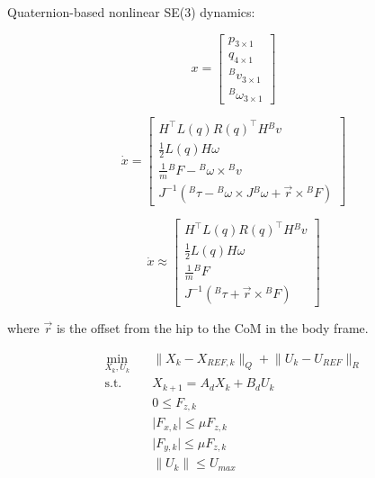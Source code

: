 \documentclass{article}
\begin{document}
Quaternion-based nonlinear SE(3) dynamics:

\begin{equation}
x = 
\begin{bmatrix}
	p_{3 \times 1}\\
	q_{4 \times 1}\\
	{}^Bv_{3 \times 1}\\
	{}^B\omega_{3 \times 1}
\end{bmatrix}
\end{equation}

\begin{equation}
\dot x = 
\begin{bmatrix}
	H^{\top} L(q)R(q)^{\top}H {}^Bv\\
	\frac{1}{2} L(q)H\omega\\
	\frac{1}{m} {}^BF - {}^B\omega \times {}^Bv \\
	J^{-1}({}^B\tau - {}^B\omega \times J {}^B\omega + \overrightarrow{r} \times {}^BF)
\end{bmatrix}
\end{equation}

\begin{equation}
\dot x \approx 
\begin{bmatrix}
	H^{\top} L(q)R(q)^{\top}H {}^Bv\\
	\frac{1}{2} L(q)H\omega\\
	\frac{1}{m} {}^BF \\
	J^{-1}({}^B\tau + \overrightarrow{r} \times {}^BF)
\end{bmatrix}
\end{equation}

where $\overrightarrow{r}$ is the offset from the hip to the CoM in the body frame.

\begin{align}
\min_{X_k,U_k} \quad & \lVert X_k - X_{REF, k} \lVert_Q + \lVert U_k - U_{REF} \lVert_R \\
\textrm{s.t.} \quad & X_{k+1} = A_d X_k + B_d U_k \\
  & 0 \leq {F_{z, k}} \\
  & \lvert{F_{x, k}}\rvert \leq \mu {F_{z, k}} \\
  & \lvert{F_{y, k}}\rvert \leq \mu {F_{z, k}} \\   
  & \lVert{U_k}\rVert \leq U_{max} \\   
\end{align}

    
\end{document}
